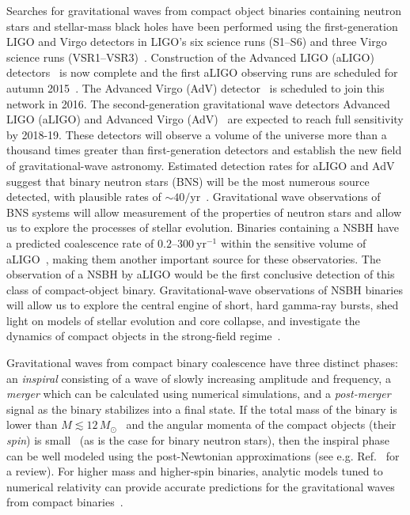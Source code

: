 

Searches for gravitational waves from compact object
binaries containing neutron stars and stellar-mass black holes have been
performed using the first-generation LIGO and Virgo detectors in LIGO's six
science runs (S1--S6) and three Virgo science runs
(VSR1--VSR3)~\cite{Abbott:2003pj,Abbott:2005pe,Abbott:2005kq,Abbott:2007xi,Abbott:2007ai,Abbott:2009tt,Abbott:2009qj,Abadie:2010yba,Abadie:2011nz}.
Construction of the Advanced LIGO (aLIGO) detectors~\cite{TheLIGOScientific:2014jea} is now complete and the
first aLIGO observing runs are scheduled for autumn 2015~\cite{Aasi:2013wya}.
The Advanced Virgo (AdV) detector~\cite{Acernese:2015gua} is scheduled to join this network in 2016.
The second-generation gravitational wave detectors Advanced LIGO (aLIGO) and
Advanced Virgo (AdV)~\cite{Harry:2010zz, aVirgo} are expected to reach full 
sensitivity by 2018-19. These detectors
will observe a volume of the universe more than a thousand times greater than
first-generation detectors and establish the new field of gravitational-wave
astronomy. Estimated detection rates for aLIGO and AdV suggest that binary
neutron stars (BNS) will be the most numerous source detected, with plausible
rates of $\sim 40/\mathrm{yr}$~\cite{Abadie:2010cf}.
Gravitational wave
observations of BNS systems will allow measurement of the properties of
neutron stars and allow us to explore the processes of stellar evolution. 
Binaries containing a \ac{NSBH} have a predicted  
coalescence rate of $0.2$--$300\ \textrm{yr}^{-1}$ within the sensitive volume
of aLIGO~\cite{Abadie:2010cf}, making them another important source for these
observatories. The observation of a \ac{NSBH} by \ac{aLIGO} would be the first 
conclusive detection of this class of compact-object binary. Gravitational-wave observations of \ac{NSBH} binaries will allow us to explore the central engine of short,
hard gamma-ray bursts, shed light on models of stellar evolution and core
collapse, and investigate the dynamics of compact 
objects in the strong-field regime~\cite{lrr-2009-2, Eichler:1989ve, Narayan:1992iy, Paczynski:1991aq, Berger:2010qx, Fryer:2011cx, Hannam:2013uu}.

Gravitational waves from compact binary coalescence have three distinct
phases: an \emph{inspiral} consisting of a wave of slowly increasing amplitude
and frequency, a \emph{merger} which can be calculated using numerical
simulations, and a \emph{post-merger} signal as the binary stabilizes into a final
state. If the total mass of the binary is lower than $M \lesssim 12\,
M_\odot$~\cite{Buonanno:2009zt,Brown:2012nn}
and the angular momenta of the compact objects (their \emph{spin}) is
small~\cite{Nitz:2013mxa,Kumar:2015tha}
(as is the case for binary neutron stars), then the inspiral phase can be 
well modeled using the post-Newtonian approximations (see e.g.
Ref.~\cite{Blanchet:2013haa} for a review).  For higher mass and higher-spin
binaries, analytic models tuned to numerical relativity can provide accurate
predictions for the gravitational waves from compact 
binaries~\cite{Buonanno:1998gg,Pan:2009wj,Damour:2012ky,Taracchini:2013rva,Damour:2014sva}. 

